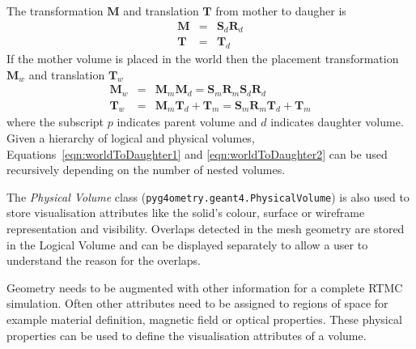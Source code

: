 \documentclass[final,5p,times,twocolumn]{elsarticle}
\begin{document}
The transformation  $\mathbf{M}$  and translation $\mathbf{T}$ from mother to daugher is 
\begin{eqnarray}
\mathbf{M} 	& = &  \mathbf{S}_d  \mathbf{R}_d \\
\mathbf{T} 	& = &  \mathbf{T}_d
\end{eqnarray}
%
If the mother volume is placed in the world then the placement transformation $\mathbf{M}_w$ and translation $\mathbf{T}_w$ 
\begin{eqnarray}
\mathbf{M}_w	  	& = & \mathbf{M}_m \mathbf{M}_d  = \mathbf{S}_m \mathbf{R}_m  \mathbf{S}_d \mathbf{R}_d				\label{eqn:worldToDaughter1}\\
\mathbf{T}	_w 		& = & \mathbf{M}_m \mathbf{T}_d + \mathbf{T}_m= \mathbf{S}_m \mathbf{R}_m \mathbf{T}_d + \mathbf{T}_m  \label{eqn:worldToDaughter2}
\end{eqnarray}
where the subscript $p$ indicates parent volume and $d$ indicates daughter volume. Given a hierarchy of logical and physical volumes, 
Equations~\ref{eqn:worldToDaughter1} and \ref{eqn:worldToDaughter2} can be used recursively depending on the number of nested volumes.

The {\it Physical Volume} class (\lstinline{pyg4ometry.geant4.PhysicalVolume}) is also used to store visualisation attributes like the solid's 
colour, surface or wireframe representation and visibility. Overlaps detected in the mesh geometry are
stored in the Logical Volume and can be  displayed separately to allow a user to understand the reason for 
the overlaps.   

Geometry needs to be augmented with other information for a complete RTMC simulation. Often other attributes need to be 
assigned to regions of space for example material definition, magnetic field or optical properties. These physical properties 
can be used to define the visualisation attributes of a volume. 
\end{document}
